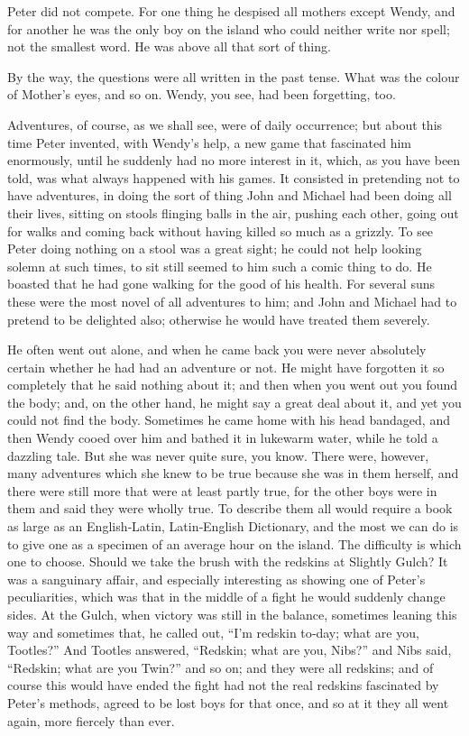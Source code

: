 Peter did not compete.
For one thing he despised all mothers except Wendy,
and for another he was the only boy on the island who could neither write nor spell;
not the smallest word.
He was above all that sort of thing.

By the way, the questions were all written in the past tense.
What was the colour of Mother’s eyes, and so on.
Wendy, you see, had been forgetting, too.

Adventures, of course, as we shall see, were of daily occurrence;
but about this time Peter invented, with Wendy’s help, a new game that fascinated him enormously,
until he suddenly had no more interest in it,
which, as you have been told, was what always happened with his games.
It consisted in pretending not to have adventures,
in doing the sort of thing John and Michael had been doing all their lives,
sitting on stools flinging balls in the air, pushing each other,
going out for walks and coming back without having killed so much as a grizzly.
To see Peter doing nothing on a stool was a great sight;
he could not help looking solemn at such times, to sit still seemed to him such a comic thing to do.
He boasted that he had gone walking for the good of his health.
For several suns these were the most novel of all adventures to him;
and John and Michael had to pretend to be delighted also;
otherwise he would have treated them severely.

He often went out alone,
and when he came back you were never absolutely certain whether he had had an adventure or not.
He might have forgotten it so completely that he said nothing about it;
and then when you went out you found the body;
and, on the other hand, he might say a great deal about it, and yet you could not find the body.
Sometimes he came home with his head bandaged,
and then Wendy cooed over him and bathed it in lukewarm water, while he told a dazzling tale.
But she was never quite sure, you know.
There were, however, many adventures which she knew to be true because she was in them herself,
and there were still more that were at least partly true,
for the other boys were in them and said they were wholly true.
To describe them all would require a book as large as an English‐Latin, Latin‐English Dictionary,
and the most we can do is to give one as a specimen of an average hour on the island.
The difficulty is which one to choose.
Should we take the brush with the redskins at Slightly Gulch?
It was a sanguinary affair,
and especially interesting as showing one of Peter’s peculiarities,
which was that in the middle of a fight he would suddenly change sides.
At the Gulch, when victory was still in the balance,
sometimes leaning this way and sometimes that, he called out, “I’m redskin to‐day;
what are you, Tootles?”
And Tootles answered, “Redskin;
what are you, Nibs?\@” and Nibs said, “Redskin;
what are you Twin?\@” and so on;
and they were all redskins;
and of course this would have ended the fight
had not the real redskins fascinated by Peter’s methods,
agreed to be lost boys for that once, and so at it they all went again, more fiercely than ever.


